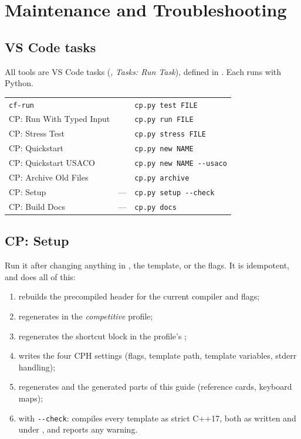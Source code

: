 \chapter{Maintenance and Troubleshooting}\label{ch:maintenance}

\section{VS Code tasks}

All tools are VS Code tasks (, \emph{Tasks: Run Task}), defined in .
Each runs  with Python.

\begin{center}
\begin{tabularx}{\linewidth}{>{\raggedright\arraybackslash}p{4.2cm}p{3.3cm}L}
\toprule
{} &  &  \\
\midrule
\texttt{cf-run} &  & \texttt{cp.py test FILE} \\
CP: Run With Typed Input &  & \texttt{cp.py run FILE} \\
CP: Stress Test &  & \texttt{cp.py stress FILE} \\
CP: Quickstart &  & \texttt{cp.py new NAME} \\
CP: Quickstart USACO &  & \texttt{cp.py new NAME -{}-usaco} \\
CP: Archive Old Files &  & \texttt{cp.py archive} \\
CP: Setup & --- & \texttt{cp.py setup -{}-check} \\
CP: Build Docs & --- & \texttt{cp.py docs} \\
\bottomrule
\end{tabularx}
\end{center}

\section{CP: Setup}

Run it after changing anything in , the template, or the flags. It is idempotent, and does all of this:

\begin{enumerate}
  \item rebuilds the precompiled header for the current compiler and flags;
  \item regenerates  in the \emph{competitive} profile;
  \item regenerates the shortcut block in the profile's ;
  \item writes the four CPH settings (flags, template path, template variables, stderr handling);
  \item regenerates  and the generated parts of this guide (reference cards, keyboard maps);
  \item with \texttt{-{}-check}: compiles every template as strict C++17, both as written and under
        , and reports any warning.
\end{enumerate}

